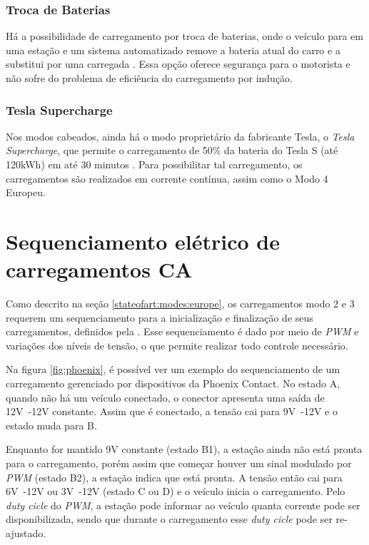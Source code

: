       \subsubsection{Troca de Baterias}
      \label{stateofart:modes:other:swap}

        Há a possibilidade de carregamento por troca de baterias, onde o veículo para em uma estação e um sistema automatizado remove a bateria atual do carro e a substitui por uma carregada \cite{battery-swap}. Essa opção oferece segurança para o motorista e não sofre do problema de eficiência do carregamento por indução. 

      \subsubsection{Tesla Supercharge}
      \label{stateofart:modes:tesla}

        Nos modos cabeados, ainda há o modo proprietário da fabricante Tesla, o \textit{Tesla Supercharge}, que permite o carregamento de 50\% da bateria do Tesla S (até 120kWh) em até 30 minutos \cite{tesla-supercharge}. Para possibilitar tal carregamento, os carregamentos são realizados em corrente contínua, assim como o Modo 4 Europeu.

  \section{Sequenciamento elétrico de carregamentos CA}
  \label{stateofart:pwm-seq}
    Como descrito na seção \ref{stateofart:modes:europe}, os carregamentos modo 2 e 3 requerem um sequenciamento para a inicialização e finalização de seus carregamentos, definidos pela \cite{iec-62196}. Esse sequenciamento é dado por meio de \textit{\ac{PWM}} e variações dos níveis de tensão, o que permite realizar todo controle necessário.

    Na figura \ref{fig:phoenix}, é possível ver um exemplo do sequenciamento de um carregamento gerenciado por dispositivos da Phoenix Contact. No estado A, quando não há um veículo conectado, o conector apresenta uma saída de 12V~-12V constante. Assim que é conectado, a tensão cai para 9V~-12V e o estado muda para B. 

    Enquanto for mantido 9V constante (estado B1), a estação ainda não está pronta para o carregamento, porém assim que começar houver um sinal modulado por \textit{\ac{PWM}} (estado B2), a estação indica que está pronta. A tensão então cai para 6V~-12V ou 3V~-12V (estado C ou D) e o veículo inicia o carregamento. Pelo \textit{duty cicle} do \textit{\ac{PWM}}, a estação pode informar ao veículo quanta corrente pode ser disponibilizada, sendo que durante o carregamento esse \textit{duty cicle} pode ser re-ajustado. 

